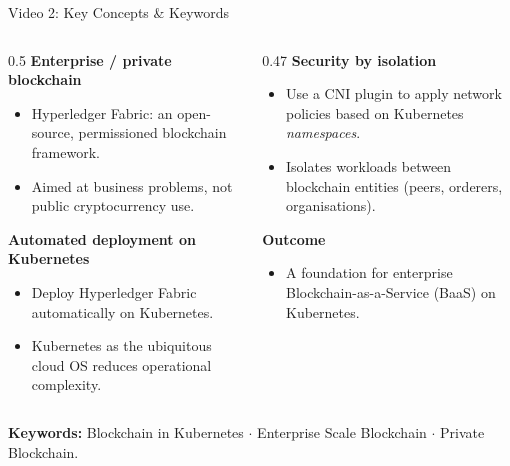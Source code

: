 \documentclass[aspectratio=169,11pt]{beamer}
\begin{document}
\begin{frame}{Video 2: Key Concepts \& Keywords}
  \footnotesize
  \begin{columns}[T,onlytextwidth]
    \begin{column}{0.5\textwidth}
      \textbf{Enterprise / private blockchain}
      \begin{itemize}
        \item \alert{Hyperledger Fabric}: an open-source, permissioned blockchain framework.
        \item Aimed at business problems, not public cryptocurrency use.
      \end{itemize}
      \textbf{Automated deployment on Kubernetes}
      \begin{itemize}
        \item Deploy Hyperledger Fabric automatically on Kubernetes.
        \item Kubernetes as the ubiquitous cloud OS reduces operational complexity.
      \end{itemize}
    \end{column}
    \begin{column}{0.47\textwidth}
      \textbf{Security by isolation}
      \begin{itemize}
        \item Use a \alert{CNI plugin} to apply network policies based on Kubernetes \emph{namespaces}.
        \item Isolates workloads between blockchain entities (peers, orderers, organisations).
      \end{itemize}
      \textbf{Outcome}
      \begin{itemize}
        \item A foundation for enterprise \alert{Blockchain-as-a-Service (BaaS)} on Kubernetes.
      \end{itemize}
    \end{column}
  \end{columns}
  \vfill
  \textbf{Keywords:} \alert{Blockchain in Kubernetes} \;$\cdot$\; \alert{Enterprise Scale Blockchain} \;$\cdot$\; \alert{Private Blockchain}.
\end{frame}
\end{document}
